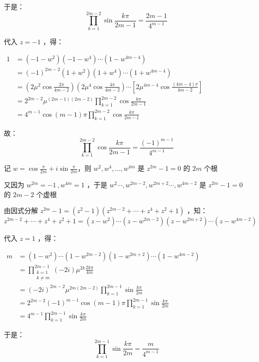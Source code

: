 于是： 
\begin{equation}%
\prod_{k=1}^{2m-2}\sin\frac{k\pi}{2m-1}=\frac{2m-1}{4^{m-1}}
\end{equation}

代入 $z=-1$ ，得：

$\begin{eqnarray*} 1&=(-1-w^2)(-1-w^4)\cdots(1-w^{4m-4})\\ &=(-1)^{2m-2}(1+w^2)(1+w^4)\cdots(1+w^{4m-4})\\ &=\left(2\mu^2\cos\frac{2\pi}{4m-2}\right)\left(2\mu^4\cos\frac{4\pi}{4m-2}\right)\cdots\left[2\mu^{4m-4}\cos\frac{(4m-4)\pi}{4m-2}\right]\\ &=2^{2m-2}\mu^{(2m-1)(2m-2)}\prod_{k=1}^{2m-2}\cos\frac{k\pi}{2m-1}\\ &=4^{m-1}\cos(m-1)\pi\prod_{k=1}^{2m-2}\cos\frac{k\pi}{2m-1} \end{eqnarray*}$ 

故：
\begin{equation}%
\prod_{k=1}^{2m-2}\cos\frac{k\pi}{2m-1}=\frac{(-1)^{m-1}}{4^{m-1}} 
\end{equation}

记 $\displaystyle{w=\cos\frac{\pi}{2m}+i\sin\frac{\pi}{2m}}$，则 $w^2,w^4,\dots ,w^{4m}$ 是 $z^{2m}-1=0$ 的 $2m$ 个根

又因为 $w^{2m}=-1\,,w^{4m}=1$ ，于是 $w^2\cdots,w^{2m-2},w^{2m+2}\cdots,w^{4m-2}$ 是 $z^{2m}-1=0$ 的 $2m-2$ 个虚根

由因式分解 $z^{2m}-1=(z^2-1)(z^{2m-2}+\cdots+z^4+z^2+1)$ ，知：
$$z^{2m-2}+\cdots+z^4+z^2+1=(z-w^2)\cdots(z-w^{2m-2})(z-w^{2m+2})\cdots(z-w^{4m-2})$$

代入 $z=1$ ，得：

$\begin{eqnarray*} m&=(1-w^2)\cdots(1-w^{2m-2})(1-w^{2m+2})\cdots(1-w^{4m-2})\\ &=\prod_{\substack{k=1\\k\neq m}}^{2m-1}(-2i)\mu^{2k}\frac{2k\pi}{4m}\\ &=(-2i)^{2m-2}\mu^{2m(2m-2)}\prod_{k=1}^{2m-1}\sin\frac{k\pi}{2m}\\ &=2^{2m-2}(-1)^{m-1}\cos(m-1)\pi\prod_{k=1}^{2m-1}\sin\frac{k\pi}{2m}\\ &=4^{m-1}\prod_{k=1}^{2m-1}\sin\frac{k\pi}{2m} \end{eqnarray*}$

于是：
\begin{equation}%
\prod_{k=1}^{2m-1}\sin\frac{k\pi}{2m}=\frac{m}{4^{m-1}}
\end{equation}

